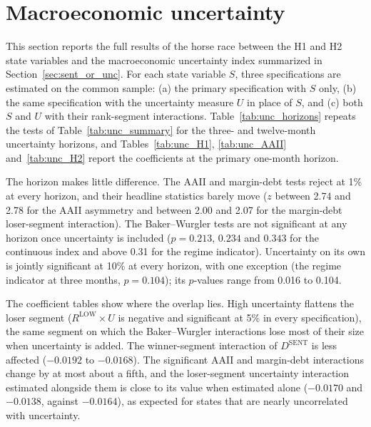 \documentclass[12pt, oneside]{report}
\begin{document}
\section{Macroeconomic uncertainty}
\label{app:uncertainty}

\noindent This section reports the full results of the horse race between
the H1 and H2 state variables and the \textcite{JuradoLudvigsonNg2015}
macroeconomic uncertainty index summarized in
Section~\ref{sec:sent_or_unc}. For each state variable $S$, three
specifications are estimated on the common sample: (a) the primary
specification with $S$ only, (b) the same specification with the
uncertainty measure $U$ in place of $S$, and (c) both $S$ and $U$ with
their rank-segment interactions. Table~\ref{tab:unc_horizons} repeats the
tests of Table~\ref{tab:unc_summary} for the three- and twelve-month
uncertainty horizons, and Tables~\ref{tab:unc_H1}, \ref{tab:unc_AAII}
and~\ref{tab:unc_H2} report the coefficients at the primary one-month
horizon.



\noindent The horizon makes little difference. The AAII and margin-debt
tests reject at 1\% at every horizon, and their headline statistics
barely move ($z$ between 2.74 and 2.78 for the AAII asymmetry and between
2.00 and 2.07 for the margin-debt loser-segment interaction). The
Baker--Wurgler tests are not significant at any horizon once
uncertainty is included ($p = 0.213$, $0.234$ and $0.343$ for the
continuous index and above 0.31 for the regime indicator). Uncertainty on
its own is jointly significant at 10\% at every horizon, with one
exception (the regime indicator at three months, $p = 0.104$); its
$p$-values range from 0.016 to 0.104.

\begingroup\singlespacing  %





\endgroup

\noindent The coefficient tables show where the overlap lies. High
uncertainty flattens the loser segment ($R^{\text{LOW}} \times U$ is
negative and significant at 5\% in every specification), the same
segment on which the Baker--Wurgler interactions lose most of their size
when uncertainty is added. The winner-segment interaction of
$D^{\text{SENT}}$ is less affected ($-0.0192$ to $-0.0168$). The
significant AAII and margin-debt interactions change by at most about a
fifth, and the loser-segment uncertainty interaction estimated alongside
them is close to its value when estimated alone ($-0.0170$ and $-0.0138$,
against $-0.0164$), as expected for states that are nearly uncorrelated
with uncertainty.
\end{document}
